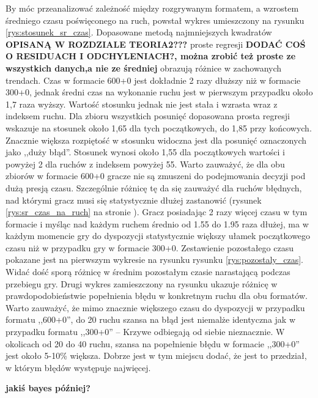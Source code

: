 \documentclass[inzynierska]{pwr_wmat_praca_dyplomowa}
\theoremstyle{plain}
\numberwithin{theorem}{chapter}
\theoremstyle{definition}
\numberwithin{theorem}{chapter}
\begin{document}
By móc przeanalizować zależność między rozgrywanym formatem, a wzrostem średniego czasu poświęconego na ruch, powstał wykres umieszczony na rysunku \ref{rys:stosunek_sr_czas}. Dopasowane metodą najmniejszych kwadratów \textbf{OPISANĄ W ROZDZIALE TEORIA2???} proste regresji \textbf{DODAĆ COŚ O RESIDUACH I ODCHYLENIACH?, można zrobić też proste ze wszystkich danych,a nie ze średniej} obrazują różnice w zachowanych trendach. Czas w formacie 600+0 jest dokładnie 2 razy dłuższy niż w formacie 300+0, jednak średni czas na wykonanie ruchu jest w pierwszym przypadku około 1,7 raza wyższy. Wartość stosunku jednak nie jest stała i wzrasta wraz z indeksem ruchu. Dla zbioru wszystkich posunięć dopasowana prosta regresji wskazuje na stosunek około 1,65 dla tych początkowych, do 1,85 przy końcowych. Znacznie większa rozpiętość w stosunku widoczna jest dla posunięć oznaczonych jako ,,duży błąd''. Stosunek wynosi około 1,55 dla początkowych wartości i powyżej 2 dla ruchów z indeksem powyżej 55. Warto zauważyć, że dla obu zbiorów w formacie 600+0 gracze nie są zmuszeni do podejmowania decyzji pod dużą presją czasu. Szczególnie różnicę tę da się zauważyć dla ruchów błędnych, nad którymi gracz musi się statystycznie dłużej zastanowić (rysunek \ref{rys:sr_czas_na_ruch} na stronie \pageref{rys:sr_czas_na_ruch}). Gracz posiadając 2 razy więcej czasu w tym formacie i myśląc nad każdym ruchem średnio od 1.55 do 1.95 raza dłużej,  ma w każdym momencie gry do dyspozycji statystycznie większy ułamek początkowego czasu niż w przypadku gry w formacie 300+0. Zestawienie pozostałego czasu pokazane jest na pierwszym wykresie na rysunku rysunku \ref{rys:pozostaly_czas}. Widać dość sporą różnicę w średnim pozostałym czasie narastającą podczas przebiegu gry. Drugi wykres zamieszczony na rysunku ukazuje różnicę w prawdopodobieństwie popełnienia błędu w konkretnym ruchu dla obu formatów. Warto zauważyć, że mimo znacznie większego czasu do dyspozycji w przypadku formatu ,,600+0'', do 20 ruchu szansa na błąd jest niemalże identyczna jak w przypadku formatu ,,300+0'' -- Krzywe odbiegają od siebie nieznacznie. W okolicach od 20 do 40 ruchu, szansa na popełnienie błędu w formacie ,,300+0'' jest około 5-10\% większa. Dobrze jest w tym miejscu dodać, że jest to przedział, w którym błędów występuje najwięcej.

\textbf{jakiś bayes później? }
\end{document}
